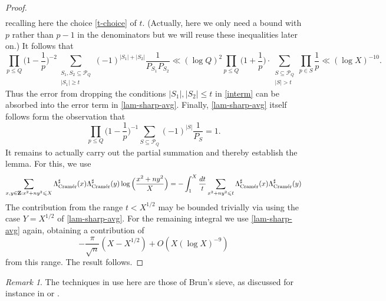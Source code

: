 \documentclass[11pt,reqno]{amsart}
\numberwithin{equation}{section}
\theoremstyle{definition}
\theoremstyle{remark}
\newtheorem*{remark}{Remark}
\newcommand{\mc}{\mathcal}
\renewcommand{\le}{\leqslant}
\renewcommand{\ge}{\geqslant}
\newcommand\Z{\mathbf{Z}}
\newcommand\cramer{{\textnormal{Cram\'er}}}
\begin{document}
\begin{proof}
\begin{align}
\end{align}
recalling here the choice \cref{t-choice} of $t$. (Actually, here we only need a bound with $p$ rather than $p-1$ in the denominators but we will reuse these inequalities later on.)
It follows that 
\[ \prod_{p \le Q} \Big(1 - \frac{1}{p}\Big)^{-2} \sum_{\substack{S_1, S_2 \subseteq \mc{P}_Q \\ |S_1| \ge t}} (-1)^{|S_1| + |S_2|} \frac{1}{P_{S_1} P_{S_2}} \ll (\log Q)^2 \prod_{p \le Q}\Big(1 + \frac{1}{p}\Big) \cdot \sum_{\substack{S \subseteq \mc{P}_Q \\ |S| > t}} \prod_{p \in S}\frac{1}{p} \ll (\log X)^{-10}.\] Thus the error from dropping the conditions $|S_1|, |S_2| \le t$ in \cref{interm} can be absorbed into the error term in \cref{lam-sharp-avg}.
Finally, \cref{lam-sharp-avg} itself follows form the observation that
\[ \prod_{p \le Q} \Big(1 - \frac{1}{p}\Big)^{-1} \sum_{S \subseteq \mc{P}_Q} (-1)^{|S|} \frac{1}{P_S} = 1.\]
It remains to actually carry out the partial summation and thereby establish the lemma. For this, we use
\[ \sum_{x, y \in \Z: x^2 + ny^2 \le X }\Lambda_{\cramer}^{\sharp}(x) \Lambda_{\cramer}^{\sharp}(y) \log \Big(\frac{x^2 + ny^2}{X}\Big)  = - \int^X_1 \frac{dt}{t}  \sum_{x^2 + ny^2 \le t} \Lambda_{\cramer}^{\sharp}(x) \Lambda_{\cramer}^{\sharp}(y) \]
The contribution from the range $t < X^{1/2}$ may be bounded trivially via using the case $Y = X^{1/2}$ of \cref{lam-sharp-avg}. For the remaining integral we use \cref{lam-sharp-avg} again, obtaining a contribution of 
\[ -\frac{\pi}{\sqrt{n}} (X - X^{1/2}) + O(X (\log X)^{-9})\] from this range. The result follows.
\end{proof}
\begin{remark}
The techniques in use here are those of Brun's sieve, as discussed for instance in \cite[Chapter 6]{opera-cribro} or \cite[Chapter 17]{koukoulopoulos}.
\end{remark}
\end{document}
